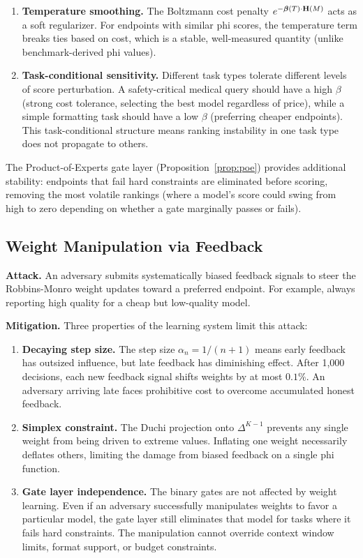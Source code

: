 \begin{enumerate}
    \item \textbf{Temperature smoothing.} The Boltzmann cost penalty $e^{-\boldsymbol{\beta}(T) \cdot \mathbf{H}(M)}$ acts as a soft regularizer. For endpoints with similar phi scores, the temperature term breaks ties based on cost, which is a stable, well-measured quantity (unlike benchmark-derived phi values).

    \item \textbf{Task-conditional sensitivity.} Different task types tolerate different levels of score perturbation. A safety-critical medical query should have a high $\beta$ (strong cost tolerance, selecting the best model regardless of price), while a simple formatting task should have a low $\beta$ (preferring cheaper endpoints). This task-conditional structure means ranking instability in one task type does not propagate to others.
\end{enumerate}

The Product-of-Experts gate layer (Proposition~\ref{prop:poe}) provides additional stability: endpoints that fail hard constraints are eliminated before scoring, removing the most volatile rankings (where a model's score could swing from high to zero depending on whether a gate marginally passes or fails).

\subsection{Weight Manipulation via Feedback}

\textbf{Attack.} An adversary submits systematically biased feedback signals to steer the Robbins-Monro weight updates toward a preferred endpoint. For example, always reporting high quality for a cheap but low-quality model.

\textbf{Mitigation.} Three properties of the learning system limit this attack:

\begin{enumerate}
    \item \textbf{Decaying step size.} The step size $\alpha_n = 1/(n+1)$ means early feedback has outsized influence, but late feedback has diminishing effect. After 1,000 decisions, each new feedback signal shifts weights by at most $0.1\%$. An adversary arriving late faces prohibitive cost to overcome accumulated honest feedback.

    \item \textbf{Simplex constraint.} The Duchi projection onto $\Delta^{K-1}$ prevents any single weight from being driven to extreme values. Inflating one weight necessarily deflates others, limiting the damage from biased feedback on a single phi function.

    \item \textbf{Gate layer independence.} The binary gates are not affected by weight learning. Even if an adversary successfully manipulates weights to favor a particular model, the gate layer still eliminates that model for tasks where it fails hard constraints. The manipulation cannot override context window limits, format support, or budget constraints.
\end{enumerate}

